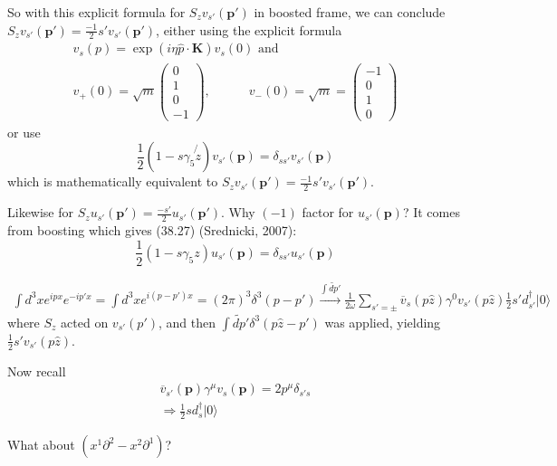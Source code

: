 \documentclass[twoside]{amsart}
\begin{document}
So with this explicit formula for $S_z v_{s'}(\mathbf{p}')$ in boosted frame, we can conclude $S_z v_{s'}(\mathbf{p'}) = \frac{-1}{2} s' v_{s'}(\mathbf{p'})$, either using the explicit formula
\[
\begin{gathered}
  v_s(p) = \exp{ (i \eta \hat{p}\cdot \mathbf{K})} v_s(0) \text{ and } \\
  v_+(0) = \sqrt{ m} \left( \begin{matrix} 0 \\ 1 \\ 0 \\ -1 \end{matrix} \right), \quad \quad \quad v_-(0) = \sqrt{m} = \left( \begin{matrix} -1 \\ 0 \\ 1 \\ 0 \end{matrix} \right) 
\end{gathered}
\]
or use 
\[
\frac{1}{2} (1 - s \gamma_5 \not{z}) v_{s'}(\mathbf{p}) = \delta_{ss'} v_{s'}(\mathbf{p} )
\]
which is mathematically equivalent to $S_z v_{s'}(\mathbf{p}') = \frac{-1}{2} s' v_{s'}(\mathbf{p'})$.  

Likewise for $S_z u_{s'}(\mathbf{p}')  = \frac{-s'}{2} u_{s'}(\mathbf{p}')$.  Why $(-1)$ factor for $u_{s'}(\mathbf{p})$?  It comes from boosting which gives (38.27) (Srednicki, 2007):
\[
\frac{1}{2}(1 - s\gamma_5 z)u_{s'}(\mathbf{p}) = \delta_{ss'} u_{s'}(\mathbf{p})
\]



\[
\begin{gathered}
  \int d^3x e^{ipx} e^{-ip'x} = \int d^3 x e^{i(p-p')x} = (2\pi)^3 \delta^3(p-p')
  \xrightarrow{ \int \widetilde{dp}' } \frac{1}{2\omega} \sum_{s'= \pm} \overline{v}_s(p\hat{z}) \gamma^0 v_{s'}(p\hat{z}) \frac{1}{2} s' d^{\dag}_{s'} |0\rangle
\end{gathered}
\]
where $S_z$ acted on $v_{s'}(p')$, and then $\int \widetilde{dp}' \delta^3(p\hat{z} - p')$ was applied, yielding $\frac{1}{2} s' v_{s'}(p\hat{z})$.  

Now recall
\[
\begin{gathered}
  \overline{v}_{s'}(\mathbf{p})\gamma^{\mu} v_s(\mathbf{p}) = 2p^{\mu} \delta_{s's} \\ 
  \Longrightarrow \frac{1}{2} s d_s^{\dag}|0\rangle
\end{gathered}
\]

What about $(x^1 \partial^2 - x^2 \partial^1)$?  
\end{document}
